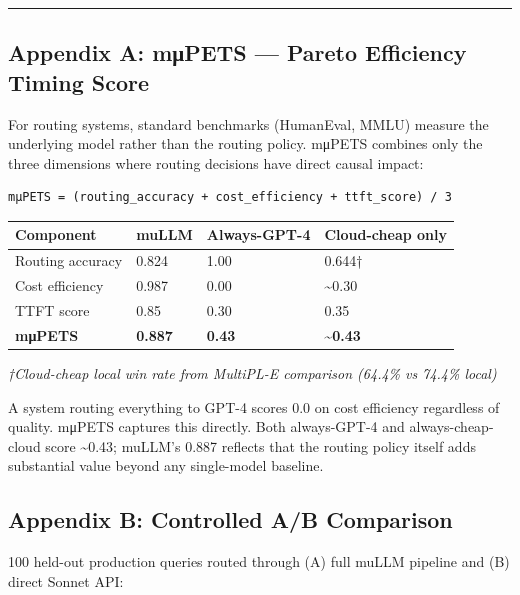 \begin{center}\rule{0.5\linewidth}{0.5pt}\end{center}

\subsection{Appendix A: mμPETS --- Pareto Efficiency Timing Score}\label{appendix-a-mux3bcpets-pareto-efficiency-timing-score}

For routing systems, standard benchmarks (HumanEval, MMLU) measure the underlying model rather than the routing policy. mμPETS combines only the three dimensions where routing decisions have direct causal impact:

\begin{verbatim}
mμPETS = (routing_accuracy + cost_efficiency + ttft_score) / 3
\end{verbatim}

{\def\LTcaptype{none} %
\begin{longtable}[]{@{}llll@{}}
\toprule\noalign{}
Component & muLLM & Always-GPT-4 & Cloud-cheap only \\
\midrule\noalign{}
\endhead
\bottomrule\noalign{}
\endlastfoot
Routing accuracy & 0.824 & 1.00 & 0.644† \\
Cost efficiency & 0.987 & 0.00 & \textasciitilde0.30 \\
TTFT score & 0.85 & 0.30 & 0.35 \\
\textbf{mμPETS} & \textbf{0.887} & \textbf{0.43} & \textbf{\textasciitilde0.43} \\
\end{longtable}
}

\emph{†Cloud-cheap local win rate from MultiPL-E comparison (64.4\% vs 74.4\% local)}

A system routing everything to GPT-4 scores 0.0 on cost efficiency regardless of quality. mμPETS captures this directly. Both always-GPT-4 and always-cheap-cloud score \textasciitilde0.43; muLLM's 0.887 reflects that the routing policy itself adds substantial value beyond any single-model baseline.

\subsection{Appendix B: Controlled A/B Comparison}\label{appendix-b-controlled-ab-comparison}

100 held-out production queries routed through (A) full muLLM pipeline and (B) direct Sonnet API:

